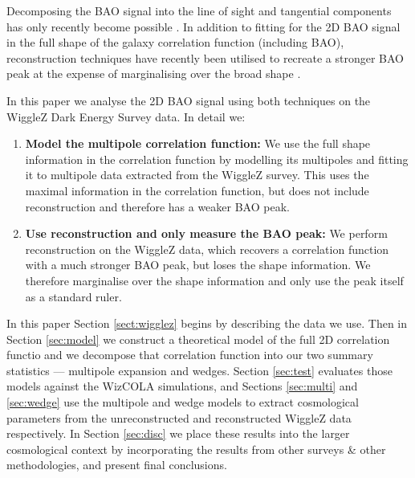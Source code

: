 \documentclass[iop,twocolappendix]{emulateapj}
\begin{document}
Decomposing the BAO signal into the line of sight and tangential components has only recently become possible \citep{Gaztanaga2009, XuCuesta2013, AndersonAubourg2014DR11, AndersonAubourg2014}. In addition to fitting for the 2D BAO signal in the full shape of the galaxy correlation function (including BAO), reconstruction techniques have recently been utilised to recreate a stronger BAO peak at the expense of marginalising over the broad shape \citep{KazinKoda2014, PadmanabhanXuEisenstein2012}.

In this paper we analyse the 2D BAO signal using both techniques on the WiggleZ Dark Energy Survey data.  In detail we:
\begin{enumerate}
\item {\bf Model the multipole correlation function:} We use the full shape information in the correlation function by modelling its multipoles and fitting it to multipole data extracted from the WiggleZ survey.  This uses the maximal information in the correlation function, but does not include reconstruction and therefore has a weaker BAO peak. 
\item {\bf Use reconstruction and only measure the BAO peak:}  We perform reconstruction on the WiggleZ data, which recovers a correlation function with a much stronger BAO peak, but loses the shape information.  We therefore marginalise over the shape information and only use the peak itself as a standard ruler. 
\end{enumerate}

In this paper Section \ref{sect:wigglez} begins by describing the data we use.  Then in Section \ref{sec:model} we construct a theoretical model of the full 2D correlation functio and we decompose that correlation function into our two summary statistics --- multipole expansion and wedges.
Section \ref{sec:test} evaluates those models against the WizCOLA simulations, and Sections \ref{sec:multi} and \ref{sec:wedge} use the multipole and wedge models to extract cosmological parameters from the unreconstructed and reconstructed WiggleZ data respectively. In Section \ref{sec:disc} we place these results into the larger cosmological context by incorporating the results from other surveys \& other methodologies, and present final conclusions.
\end{document}
